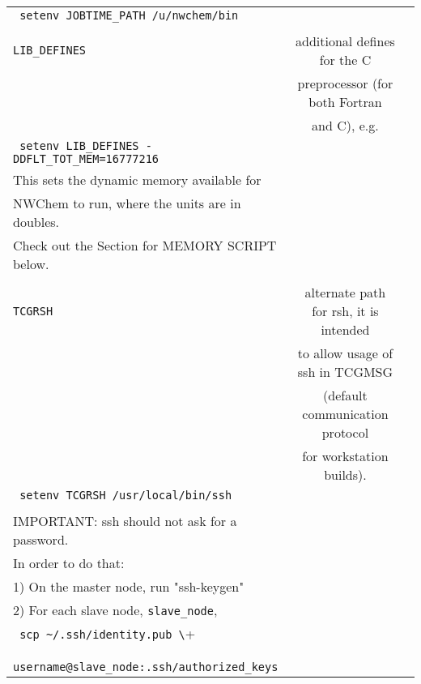 \begin{table}[htbp]
\begin{center}
\begin{tabular}{lcc}
   \verb+ setenv JOBTIME_PATH /u/nwchem/bin+\\
\\
   \verb+LIB_DEFINES+               & additional defines for the C \\
                              & preprocessor (for both Fortran \\
                              & and C), e.g.\\
   \verb+ setenv LIB_DEFINES -DDFLT_TOT_MEM=16777216+\\
       This sets the dynamic memory available for \\
       NWChem to run, where the units are in doubles.\\
       Check out the Section for MEMORY SCRIPT below.\\
 \\
   \verb+TCGRSH+                    & alternate path for rsh, it is intended \\
                              & to allow usage of ssh in TCGMSG \\
                              & (default communication protocol \\
                              & for workstation builds).\\
   \verb+ setenv TCGRSH /usr/local/bin/ssh+\\
 \\
    IMPORTANT: ssh should not ask for a password.  \\
      In order to do that:\\
      1) On the master node, run "ssh-keygen"\\
      2) For each slave node, \verb+slave_node+,\\
         \verb+ scp ~/.ssh/identity.pub \+ \\
           \verb+  username@slave_node:.ssh/authorized_keys+
\end{tabular}
\end{center}
\end{table}
